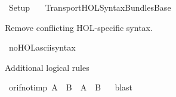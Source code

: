 %
\begin{isabellebody}%
%
%
\isadelimdocument
%
\endisadelimdocument
%
\isatagdocument
%
\isamarkuptrue%
%
\endisatagdocument
{\isafolddocument}%
%
\isadelimdocument
%
\endisadelimdocument
%
\isadelimtheory
%
\endisadelimtheory
%
\isatagtheory
{}\isamarkupfalse%
\ Setup\isanewline
\ \ \ Transport{\isachardot}{\kern0pt}HOL{\isacharunderscore}{\kern0pt}Syntax{\isacharunderscore}{\kern0pt}Bundles{\isacharunderscore}{\kern0pt}Base\isanewline
{}%
\endisatagtheory
{\isafoldtheory}%
%
\isadelimtheory
%
\endisadelimtheory
%
\begin{isamarkuptext}%
Remove conflicting HOL-specific syntax.%
\end{isamarkuptext}\isamarkuptrue%
\isamarkupfalse%
\ no{\isacharunderscore}{\kern0pt}HOL{\isacharunderscore}{\kern0pt}ascii{\isacharunderscore}{\kern0pt}syntax%
\begin{isamarkuptext}%
Additional logical rules%
\end{isamarkuptext}\isamarkuptrue%
\isamarkupfalse%
\ or{\isacharunderscore}{\kern0pt}if{\isacharunderscore}{\kern0pt}not{\isacharunderscore}{\kern0pt}imp{\isacharcolon}{\kern0pt}\ {\isachardoublequoteopen}{\isacharparenleft}{\kern0pt}{\isasymnot}A\ {\isasymLongrightarrow}\ B{\isacharparenright}{\kern0pt}\ {\isasymLongrightarrow}\ A\ {\isasymor}\ B{\isachardoublequoteclose}%
\isadelimproof
\ %
\endisadelimproof
%
\isatagproof
{}\isamarkupfalse%
\ blast%
\endisatagproof
{\isafoldproof}%
%
\isadelimproof
%
\endisadelimproof
\isanewline
\isanewline
%
\isadelimtheory
\isanewline
%
\endisadelimtheory
%
\isatagtheory
{}\isamarkupfalse%
%
\endisatagtheory
{\isafoldtheory}%
%
\isadelimtheory
%
\endisadelimtheory
%
\end{isabellebody}%
\endinput

